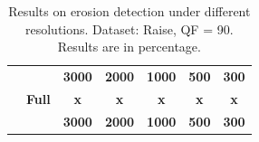 \documentclass[review]{elsarticle}
\begin{document}
\begin{table}[!t]
	\centering
	\caption{Results on erosion detection under different resolutions. Dataset: Raise, QF = 90. Results are in percentage.}
	\label{table:resolutionerosion}
		\begin{tabular}{c|cccccc}
			\hline\hline
			& &\textbf{3000}&\textbf{2000}&\textbf{1000}&\textbf{500}&\textbf{300}\\
			&\textbf{Full}&\textbf{x}&\textbf{x}&\textbf{x}&\textbf{x}&\textbf{x}\\
			&&\textbf{3000}&\textbf{2000}&\textbf{1000}&\textbf{500}&\textbf{300}\\
			\hline

\end{tabular}
\end{table}
\end{document}
